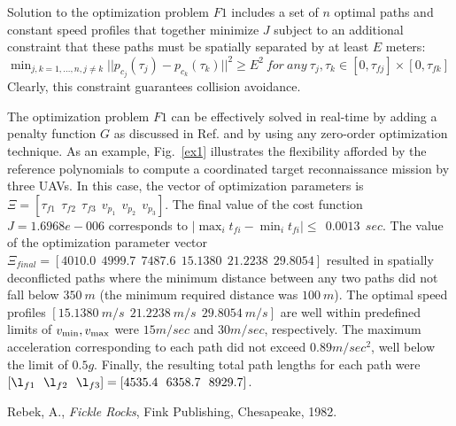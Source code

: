 \documentclass[]{aiaa-tc}%
\begin{document}
Solution to the optimization problem $F1$ includes a set of $n$ optimal paths and constant speed profiles that together minimize $J$ subject to an additional constraint that these paths must be spatially separated by at least $E$ meters:
$\displaystyle{\min_{j,k = 1, \ldots, n, j \ne k} || p_{c_j}(\tau_j)
- p_{c_k}(\tau_k)||^2 \ge E^2 ~ for ~ any ~ \tau_j, \tau_k \in [0,
\tau_{fj}] \times [0, \tau_{fk}]}$
Clearly, this constraint guarantees collision avoidance.


The optimization problem $ F1$ can be effectively solved in
real-time by adding a penalty function $G$ as discussed in Ref.
\cite{Yakimenko} and by using any zero-order optimization
technique. As an example, Fig.~\ref{ex1} illustrates the
flexibility afforded by the reference polynomials to compute a
coordinated target reconnaissance mission by three UAVs. In this
case, the vector of optimization parameters is $\Xi = [\tau_{f1}
~~ \tau_{f2} ~~ \tau_{f3} ~~ v_{p_1} ~~ v_{p_2}~~ v_{p_3}]$. The
final value of the cost function $J = 1.6968e-006$ corresponds to
$|\max_i t_{fi} - \min_i t_{fi}| \le ~~ 0.0013 ~~ sec$. The value
of the optimization parameter vector $\Xi_{final} = [4010.0 ~~
4999.7 ~~ 7487.6 ~~ 15.1380 ~~ 21.2238 ~~ 29.8054]$ resulted in
spatially deconflicted paths where the minimum distance between
any two paths did not fall below $350 ~ m$ (the minimum required
distance was $100 ~ m$). The optimal speed profiles $[15.1380~m/s
~~ 21.2238~m/s ~~ 29.8054~m/s]$ are well within predefined limits
of $v_{{\rm min}}, v_{{\rm max}}$ were $15 m/sec$ and $30 m/sec$,
respectively.
The maximum acceleration corresponding to
each path did not exceed $0.89 m/sec^2$, well below the limit of
$0.5 g$.  Finally, the resulting total path lengths for each path were
$[ \l_{f1} ~~ \l_{f2} ~~ \l_{f3} ] = [4535.4 ~~ 6358.7  ~~ 8929.7]$.




%
%



\begin{thebibliography}{9}%
 Rebek, A., {\it Fickle Rocks}, Fink Publishing, Chesapeake, 1982.
\end{thebibliography}
\end{document}
